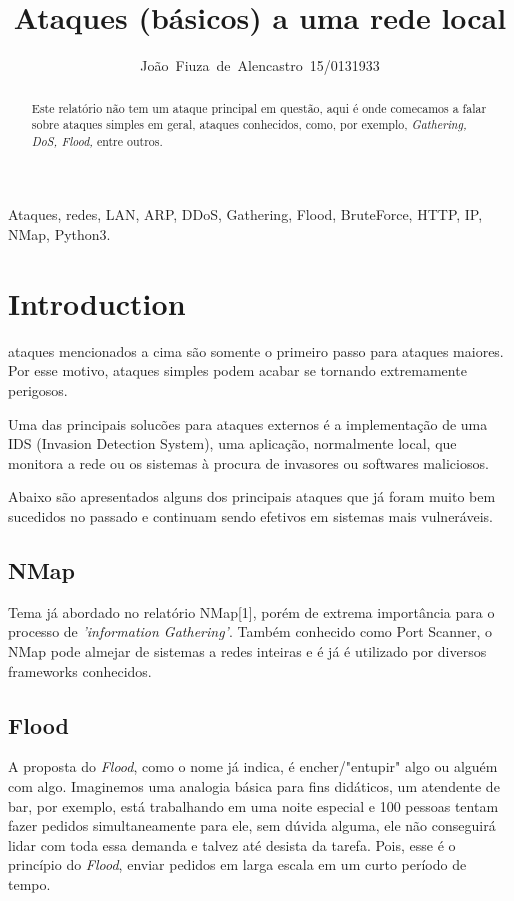 \documentclass[journal]{IEEEtran}
\begin{document}
%
\title{Ataques (básicos) a uma rede local}

\author{João~Fiuza~de~Alencastro~15/0131933}%

\maketitle

\begin{abstract}
Este relatório não tem um ataque principal em questão, aqui é onde comecamos a falar sobre ataques simples em geral, ataques conhecidos, como, por exemplo, \textit{Gathering, DoS, Flood,} entre outros.
\end{abstract}

\begin{IEEEkeywords}
Ataques, redes, LAN, ARP, DDoS, Gathering, Flood, BruteForce, HTTP, IP, NMap, Python3.
\end{IEEEkeywords}




\section{Introduction}

 ataques mencionados a cima são somente o primeiro passo para ataques maiores. Por esse motivo, ataques simples podem acabar se tornando extremamente perigosos. \par
Uma das principais solucões para ataques externos é a implementação de uma IDS (Invasion Detection System), uma aplicação, normalmente local, que monitora a rede ou os sistemas à procura de invasores ou softwares maliciosos. \par
Abaixo são apresentados alguns dos principais ataques que já foram muito bem sucedidos no passado e continuam sendo efetivos em sistemas mais vulneráveis.



\subsection{NMap}
Tema já abordado no relatório NMap[1], porém de extrema importância para o processo de \textit{'information Gathering'}. Também conhecido como Port Scanner, o NMap pode almejar de sistemas a redes inteiras e é já é utilizado por diversos frameworks conhecidos.

\subsection{Flood}
A proposta do \textit{Flood}, como o nome já indica, é encher/"entupir" algo ou alguém com algo. Imaginemos uma analogia básica para fins didáticos, um atendente de bar, por exemplo, está trabalhando em uma noite especial e 100 pessoas tentam fazer pedidos simultaneamente para ele, sem dúvida alguma, ele não conseguirá lidar com toda essa demanda e talvez até desista da tarefa. Pois, esse é o princípio do \textit{Flood}, enviar pedidos em larga escala em um curto período de tempo.
\end{document}
